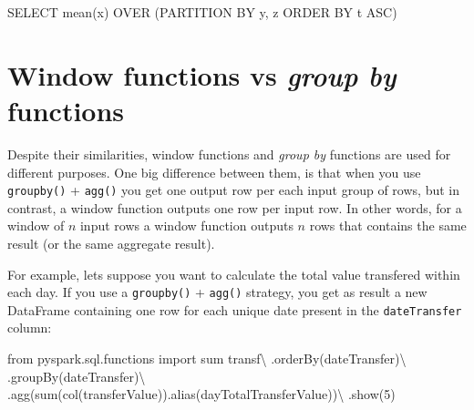 \documentclass[
  11pt,
  letterpaper,
  DIV=11,
  numbers=noendperiod]{scrreprt}
\newenvironment{Shaded}{\begin{snugshade}}{\end{snugshade}}
\newcommand{\BuiltInTok}[1]{\textcolor[rgb]{0.00,0.23,0.31}{#1}}
\newcommand{\DecValTok}[1]{\textcolor[rgb]{0.68,0.00,0.00}{#1}}
\newcommand{\ImportTok}[1]{\textcolor[rgb]{0.00,0.46,0.62}{#1}}
\newcommand{\KeywordTok}[1]{\textcolor[rgb]{0.00,0.23,0.31}{#1}}
\newcommand{\NormalTok}[1]{\textcolor[rgb]{0.00,0.23,0.31}{#1}}
\newcommand{\OperatorTok}[1]{\textcolor[rgb]{0.37,0.37,0.37}{#1}}
\newcommand{\StringTok}[1]{\textcolor[rgb]{0.13,0.47,0.30}{#1}}
\begin{document}
\begin{Shaded}
\begin{Highlighting}[]
\KeywordTok{SELECT}\NormalTok{ mean(x) }\KeywordTok{OVER}\NormalTok{ (}\KeywordTok{PARTITION} \KeywordTok{BY}\NormalTok{ y, z }\KeywordTok{ORDER} \KeywordTok{BY}\NormalTok{ t }\KeywordTok{ASC}\NormalTok{)}
\end{Highlighting}
\end{Shaded}

\section{\texorpdfstring{Window functions vs \emph{group by}
functions}{Window functions vs group by functions}}\label{window-functions-vs-group-by-functions}

Despite their similarities, window functions and \emph{group by}
functions are used for different purposes. One big difference between
them, is that when you use \texttt{groupby()} + \texttt{agg()} you get
one output row per each input group of rows, but in contrast, a window
function outputs one row per input row. In other words, for a window of
\(n\) input rows a window function outputs \(n\) rows that contains the
same result (or the same aggregate result).

For example, lets suppose you want to calculate the total value
transfered within each day. If you use a \texttt{groupby()} +
\texttt{agg()} strategy, you get as result a new DataFrame containing
one row for each unique date present in the \texttt{dateTransfer}
column:

\begin{Shaded}
\begin{Highlighting}[]
\ImportTok{from}\NormalTok{ pyspark.sql.functions }\ImportTok{import} \BuiltInTok{sum}
\NormalTok{transf}\OperatorTok{\textbackslash{}}
\NormalTok{    .orderBy(}\StringTok{\textquotesingle{}dateTransfer\textquotesingle{}}\NormalTok{)}\OperatorTok{\textbackslash{}}
\NormalTok{    .groupBy(}\StringTok{\textquotesingle{}dateTransfer\textquotesingle{}}\NormalTok{)}\OperatorTok{\textbackslash{}}
\NormalTok{    .agg(}\BuiltInTok{sum}\NormalTok{(col(}\StringTok{\textquotesingle{}transferValue\textquotesingle{}}\NormalTok{)).alias(}\StringTok{\textquotesingle{}dayTotalTransferValue\textquotesingle{}}\NormalTok{))}\OperatorTok{\textbackslash{}}
\NormalTok{    .show(}\DecValTok{5}\NormalTok{)}
\end{Highlighting}
\end{Shaded}
\end{document}
